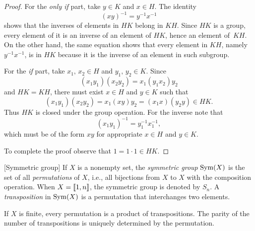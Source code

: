 \begin{proof}

For the \textit{only if\/} part, take $y\in K$ and $x \in H$. The identity
$$
    (xy)^{-1} = y^{-1}x^{-1}
$$
shows that the inverses of elements in $HK$ belong in $KH$. Since $HK$ is a group, every element of it is an inverse of an element of $HK$, hence an element of~$KH$. On the other hand, the same equation shows that every element in $KH$, namely $y^{-1}x^{-1}$, is in $HK$ because it is the inverse of an element in such subgroup.

For the \textit{if\/} part, take $x_1,\, x_2\in H$ and $y_1,\, y_2\in K$. Since
$$
    (x_1y_1)(x_2y_2) = x_1(y_1x_2)y_2
$$
and $HK=KH$, there must exist $x\in H$ and $y\in K$ such that
$$
    (x_1y_1)(x_2y_2) = x_1(xy)y_2 = (x_1x)(y_2y) \in HK.
$$
Thus $HK$ is closed under the group operation. For the inverse note that
$$
    (x_1y_1)^{-1} = y_1^{-1}x_1^{-1},
$$
which must be of the form $xy$ for appropriate $x\in H$ and $y\in K$.

To complete the proof observe that $1=1\cdot1\in HK$. \end{proof}

\begin{defns} {\rm[Symmetric group]}
    If $X$ is a nonempty set, the \textsl{symmetric group} ${\rm Sym}(X)$ is the set of all \textsl{permutations} of $X$, i.e., all bijections from $X$ to $X$ with the composition operation. When $X=\llbracket1,n\rrbracket$, the symmetric group is denoted by $S_n$. A \textsl{transposition} in ${\rm Sym}(X)$ is a permutation that interchanges two elements.
\end{defns}

\begin{lem}\label{sign-of-permutation}
    If $X$ is finite, every permutation is a product of transpositions. The parity of the number of transpositions is uniquely determined by the permutation.
\end{lem}

